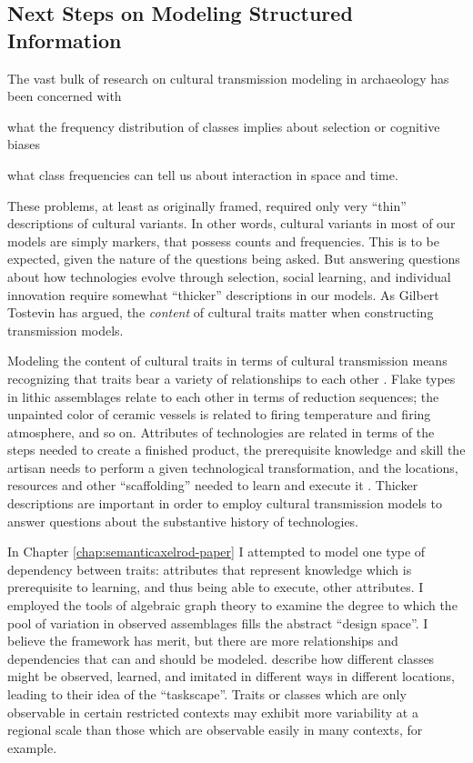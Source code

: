 \subsection{Next Steps on Modeling Structured Information}\label{conc:sec:structured-next-steps}

The vast bulk of research on cultural transmission modeling in archaeology has been concerned with \begin{dissparalist}
\item what the frequency distribution of classes implies about selection or cognitive biases
\item what class frequencies can tell us about interaction in space and time.
\end{dissparalist}  These problems, at least as originally framed, required only very ``thin'' descriptions of cultural variants.  In other words, cultural variants in most of our models are simply markers, that possess counts and frequencies.  This is to be expected, given the nature of the questions being asked.  But answering questions about how technologies evolve through selection, social learning, and individual innovation require somewhat ``thicker'' descriptions in our models.  As Gilbert Tostevin \citeyearpar{tostevin2019content} has argued, the \emph{content} of cultural traits matter when constructing transmission models.

Modeling the content of cultural traits in terms of cultural transmission means recognizing that traits bear a variety of relationships to each other \citep{mesoudi2008learning}.  Flake types in lithic assemblages relate to each other in terms of reduction sequences; the unpainted color of ceramic vessels is related to firing temperature and firing atmosphere, and so on.  Attributes of technologies are related in terms of the steps needed to create a finished product, the prerequisite knowledge and skill the artisan needs to perform a given technological transformation, and the locations, resources and other ``scaffolding'' needed to learn and execute it \citep{wimsatt2007reproducing,wimsatt2019articulating}.  Thicker descriptions are important in order to employ cultural transmission models to answer questions about the substantive history of technologies.   

In Chapter \ref{chap:semanticaxelrod-paper} I attempted to model one type of dependency between traits:  attributes that represent knowledge which is prerequisite to learning, and thus being able to execute, other attributes.  I employed the tools of algebraic graph theory to examine the degree to which the pool of variation in observed assemblages fills the abstract ``design space''.  I believe the framework has merit, but there are more relationships and dependencies that can and should be modeled.  \citet{premo2016cultural} describe how different classes might be observed, learned, and imitated in different ways in different locations, leading to their idea of the ``taskscape''.  Traits or classes which are only observable in certain restricted contexts may exhibit more variability at a regional scale than those which are observable easily in many contexts, for example.  

